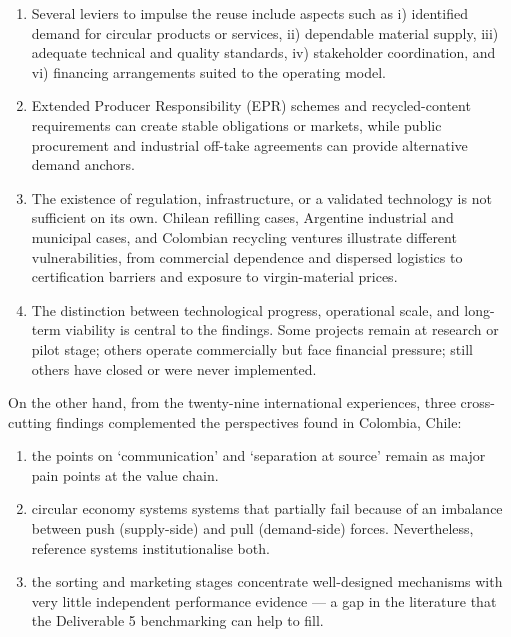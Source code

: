 \documentclass[
  12pt,
  oneside]{book}
\providecommand{\tightlist}{%
  \setlength{\itemsep}{0pt}\setlength{\parskip}{0pt}}
\begin{document}
\begin{enumerate}
\def\labelenumi{\arabic{enumi}.}
\tightlist
\item
  Several leviers to impulse the reuse include aspects such as i)
  identified demand for circular products or services, ii) dependable
  material supply, iii) adequate technical and quality standards, iv)
  stakeholder coordination, and vi) financing arrangements suited to the
  operating model.
\item
  Extended Producer Responsibility (EPR) schemes and recycled-content
  requirements can create stable obligations or markets, while public
  procurement and industrial off-take agreements can provide alternative
  demand anchors.
\item
  The existence of regulation, infrastructure, or a validated technology
  is not sufficient on its own. Chilean refilling cases, Argentine
  industrial and municipal cases, and Colombian recycling ventures
  illustrate different vulnerabilities, from commercial dependence and
  dispersed logistics to certification barriers and exposure to
  virgin-material prices.
\item
  The distinction between technological progress, operational scale, and
  long-term viability is central to the findings. Some projects remain
  at research or pilot stage; others operate commercially but face
  financial pressure; still others have closed or were never
  implemented.
\end{enumerate}

On the other hand, from the twenty-nine international experiences, three
cross-cutting findings complemented the perspectives found in Colombia,
Chile:

\begin{enumerate}
\def\labelenumi{(\roman{enumi})}
\tightlist
\item
  the points on `communication' and `separation at source' remain as
  major pain points at the value chain.
\item
  circular economy systems systems that partially fail because of an
  imbalance between push (supply-side) and pull (demand-side) forces.
  Nevertheless, reference systems institutionalise both.
\item
  the sorting and marketing stages concentrate well-designed mechanisms
  with very little independent performance evidence --- a gap in the
  literature that the Deliverable 5 benchmarking can help to fill.
\end{enumerate}
\end{document}
